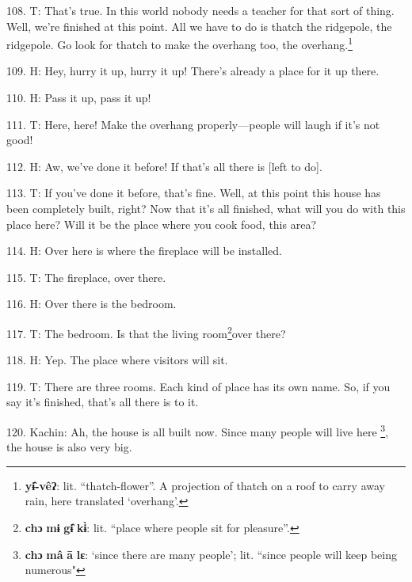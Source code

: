 108. T: That's true. In this world nobody needs a teacher for that sort of thing.
Well, we're finished at this point. All we have to do is thatch the ridgepole,
the ridgepole. Go look for thatch to make the overhang too, the overhang.\footnote{\textbf{yɨ̂-vêʔ}: lit. ``thatch-flower''. A projection of thatch on a roof to carry away rain, here translated `overhang'.}

109. H: Hey, hurry it up, hurry it up! There's already a place for it up there.

110. H: Pass it up, pass it up!

111. T: Here, here! Make the overhang properly---people will laugh if it's not
good!

112. H: Aw, we've done it before! If that's all there is [left to do].

113. T: If you've done it before, that's fine. Well, at this point this house has
been completely built, right? Now that it's all finished, what will you do with
this place here? Will it be the place where you cook food, this area?

114. H: Over here is where the fireplace will be installed.

115. T: The fireplace, over there.

116. H: Over there is the bedroom.

117. T: The bedroom. Is that the living room\footnote{\textbf{chɔ} \textbf{mɨ} \textbf{gɨ̂} \textbf{kɨ̀}: lit. ``place where people sit for pleasure''.}over there?

118. H: Yep. The place where visitors will sit.

119. T: There are three rooms. Each kind of place has its own name. So, if you
say it's finished, that's all there is to it.

120. Kachin: Ah, the house is all built now. Since many people will live here
\footnote{\textbf{chɔ} \textbf{mâ} \textbf{ā} \textbf{lɛ}: `since there are many people'; lit. ``since people will keep being numerous"}, the house is also very big.

